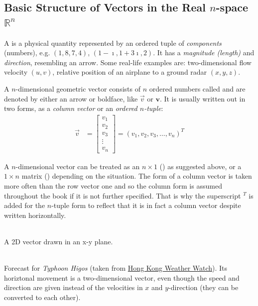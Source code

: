 \subsection{Basic Structure of Vectors in the Real $n$-space $\mathbb{R}^n$}
A  is a physical quantity represented by an ordered tuple of \textit{components} (numbers), e.g. $(1, 8, 7, 4)$, $(1-\imath, 1+3\imath, 2)$. It has a \textit{magnitude (length)} and \textit{direction}, resembling an arrow. Some real-life examples are: two-dimensional flow velocity $(u, v)$, relative position of an airplane to a ground radar $(x, y, z)$.
\begin{defn}
\label{defn:geometvec}
A $n$-dimensional geometric vector consists of $n$ ordered numbers called  and are denoted by either an arrow or boldface, like $\vec{v}$ or $\textbf{v}$. It is usually written out in two forms, as a \textit{column vector} or an \textit{ordered $n$-tuple}:
\begin{align*}
\vec{v} &=
\begin{bmatrix}
v_1 \\
v_2 \\
v_3 \\
\vdots \\
v_n
\end{bmatrix}
=
(v_1, v_2, v_3, \ldots, v_n)^T
\end{align*}
\end{defn}
A $n$-dimensional vector can be treated as an $n \times 1$ () as suggested above, or a $1 \times n$ matrix () depending on the situation. The form of a column vector is taken more often than the row vector one and so the column form is assumed throughout the book if it is not further specified. That is why the superscript $^T$ is added for the $n$-tuple form to reflect that it is in fact a column vector despite written horizontally. \par
{}\\    
A 2D vector drawn in an x-y plane.\par
{\\
Forecast for \textit{Typhoon Higos} (taken from \href{http://www.hkww.org/weather/tcarchive.html}{Hong Kong Weather Watch}). Its horiztonal movement is a two-dimensional vector, even though the speed and direction are given instead of the velocities in $x$ and $y$-direction (they can be converted to each other).}

